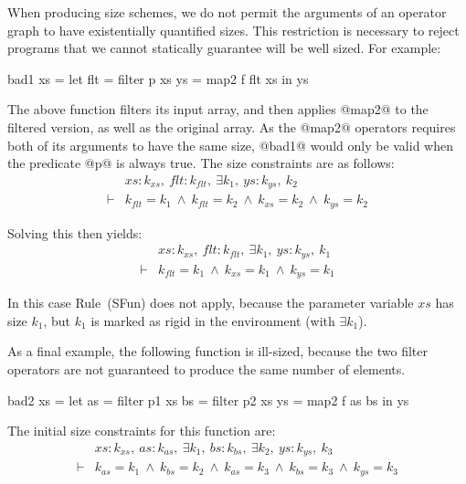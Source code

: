 When producing size schemes, we do not permit the arguments of an operator graph to have existentially quantified sizes. This restriction is necessary to reject programs that we cannot statically guarantee will be well sized. For example:
\begin{code}
    bad1 xs  = let flt   = filter p xs
                   ys    = map2   f flt xs
               in  ys
\end{code}

The above function filters its input array, and then applies @map2@ to the filtered version, as well as the original array. As the @map2@ operators requires both of its arguments to have the same size, @bad1@ would only be valid when the predicate @p@ is always true. The size constraints are as follows:
$$
\begin{array}{ll}
       & xs : k_{xs},~ flt : k_{flt},~ \exists k_1,~ ys : k_{ys},~ k_2
\\
\vdash &          k_{flt}  = k_1
        ~\wedge~  k_{flt}  = k_2
        ~\wedge~  k_{xs}   = k_2
        ~\wedge~  k_{ys}   = k_2
\end{array}
$$

\noindent
Solving this then yields:
$$
\begin{array}{ll}
       & xs : k_{xs},~ flt : k_{flt},~ \exists k_1,~ ys : k_{ys},~ k_1
\\
\vdash &          k_{flt}  = k_1
        ~\wedge~  k_{xs}   = k_1
        ~\wedge~  k_{ys}   = k_1
\end{array}
$$

In this case Rule~(SFun) does not apply, because the parameter variable $xs$ has size $k_1$, but $k_1$ is marked as rigid in the environment (with $\exists k_1$). 

As a final example, the following function is ill-sized, because the two filter operators are not guaranteed to produce the same number of elements.
\begin{code}
     bad2 xs = let as  = filter p1 xs
                   bs  = filter p2 xs
                   ys  = map2   f  as bs
               in  ys
\end{code}

The initial size constraints for this function are:
$$
\begin{array}{ll}
       & xs : k_{xs},~ as : k_{as},~ \exists k_1,~ bs : k_{bs},~ \exists k_2,~ ys : k_{ys},~ k_3
\\
\vdash &          k_{as}   = k_1
        ~\wedge~  k_{bs}   = k_2
        ~\wedge~  k_{as}   = k_3
        ~\wedge~  k_{bs}   = k_3
        ~\wedge~  k_{ys}   = k_3
\end{array}
$$

